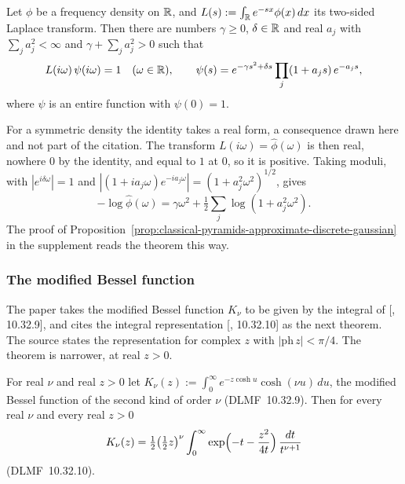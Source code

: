 \begin{theorem}
\label{thm:cited-A24}

Let $\phi$ be a \Polya{} frequency density on $\mathbb{R}$, and $L(s) := \int_{\mathbb{R}}e^{-sx}\phi(x)\,dx$ its
two-sided Laplace transform. Then there are numbers $\gamma \ge 0$, $\delta \in \mathbb{R}$ and real $a_j$
with $\sum_j a_j^2 < \infty$ and $\gamma + \sum_j a_j^2 > 0$ such that
\[
  L(i\omega)\,\psi(i\omega) = 1 \quad (\omega \in \mathbb{R}), \qquad
  \psi(s) = e^{-\gamma s^2 + \delta s}\prod_j(1 + a_j s)\,e^{-a_j s},
\]
where $\psi$ is an entire function with $\psi(0) = 1$.
\end{theorem}

For a symmetric density the identity takes a real form, a consequence drawn here and not part of the
citation. The transform $L(i\omega) = \widehat\phi(\omega)$ is then real, nowhere $0$ by the identity, and
equal to $1$ at $0$, so it is positive. Taking moduli, with $|e^{i\delta\omega}| = 1$ and
$|(1 + ia_j\omega)e^{-ia_j\omega}| = (1 + a_j^2\omega^2)^{1/2}$, gives
\[
  -\log\widehat\phi(\omega) = \gamma\omega^2 + \tfrac12\sum_j\log(1 + a_j^2\omega^2) .
\]
The proof of
Proposition~\ref{prop:classical-pyramids-approximate-discrete-gaussian} in the supplement reads the
theorem this way.

\subsubsection{The modified Bessel function}
\label{subsec:cited-bessel}

The paper takes the modified Bessel function $K_\nu$ to be given by the integral of
[, 10.32.9], and cites the integral representation [, 10.32.10]
as the next theorem. The source states the representation for complex $z$ with
$|\mathrm{ph}\,z| < \pi/4$. The theorem is narrower, at real $z > 0$.

\begin{theorem}
\label{thm:cited-A51}

For real $\nu$ and real $z > 0$ let
$K_\nu(z) := \int_0^\infty e^{-z\cosh u}\cosh(\nu u)\,du$, the modified Bessel function of the
second kind of order $\nu$ (DLMF~10.32.9). Then for every real $\nu$ and every real $z > 0$
\[
  K_\nu(z) = \tfrac12\bigl(\tfrac12 z\bigr)^{\nu}\int_0^\infty
  \exp\Bigl(-t - \frac{z^2}{4t}\Bigr)\,\frac{dt}{t^{\nu+1}}
\]
(DLMF~10.32.10).
\end{theorem}
